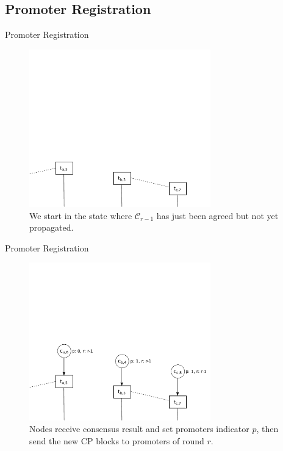 \documentclass{beamer}
\begin{document}
\subsection{Promoter Registration}
\begin{frame}{Promoter Registration}

  \begin{figure}[h]
  \includegraphics[width=0.7\textwidth]{figures/trustchain-1}
  \centering
  \caption{We start in the state where $\mathcal{C}_{r - 1}$ has just been agreed but
    not yet propagated.}
  \end{figure}

\end{frame}

\begin{frame}{Promoter Registration}

  \begin{figure}[h]
  \includegraphics[width=0.7\textwidth]{figures/trustchain-2}
  \centering
  \caption{Nodes receive consensus result and set promoters indicator $p$, then
    send the new CP blocks to promoters of round $r$.}
  \end{figure}

\end{frame}
\end{document}
